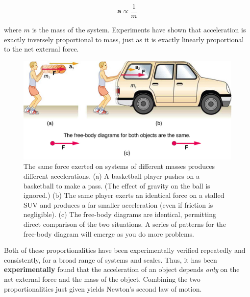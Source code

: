 \documentclass[
]{book}
\begin{document}
\leavevmode\hypertarget{eip-id1969451}{}%
\[{\textbf{a}{\propto}\frac{1}{m}}{}\]

where \(m{}\)\emph{} is the mass of the system.
Experiments have shown that acceleration is exactly inversely
proportional to mass, just as it is exactly linearly proportional to the
net external force.

\begin{figure}
\hypertarget{import-auto-id1375143}{%
\centering
\includegraphics{images/Figure 04_03_02.jpg}
\caption{The same force exerted on systems of different masses produces
different accelerations. (a) A basketball player pushes on a basketball
to make a pass. (The effect of gravity on the ball is ignored.) (b) The
same player exerts an identical force on a stalled SUV and produces a
far smaller acceleration (even if friction is negligible). (c) The
free-body diagrams are identical, permitting direct comparison of the
two situations. A series of patterns for the free-body diagram will
emerge as you do more
problems.}\label{import-auto-id1375143}
}
\end{figure}

Both of these proportionalities have been experimentally verified
repeatedly and consistently, for a broad range of systems and scales.
Thus, it has been \textbf{experimentally} found that the acceleration of an
object depends \emph{only} on the net external force and the mass of the
object. Combining the two proportionalities just given yields Newton's
second law of motion.
\end{document}
